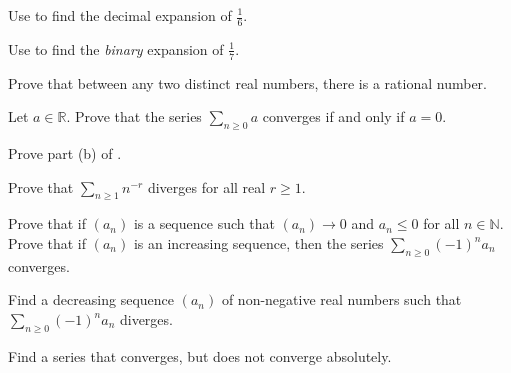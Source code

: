 \begin{exercise}
Use  to find the decimal expansion of $\frac{1}{6}$.
\end{exercise}

\begin{exercise}
Use  to find the \textit{binary} expansion of $\frac{1}{7}$.
\end{exercise}

\begin{exercise}
Prove that between any two distinct real numbers, there is a rational number.
\end{exercise}


\begin{exercise}
Let $a \in \mathbb{R}$. Prove that the series $\sum_{n \ge 0} a$ converges if and only if $a=0$.
\end{exercise}


\begin{exercise}
Prove part (b) of .
\end{exercise}


\begin{exercise}
Prove that $\displaystyle \sum_{n \ge 1} n^{-r}$ diverges for all real $r \ge 1$.
\end{exercise}



\begin{exercise}
Prove that if $(a_n)$ is a sequence such that $(a_n) \to 0$ and $a_n \le 0$ for all $n \in \mathbb{N}$. Prove that if $(a_n)$ is an increasing sequence, then the series $\displaystyle \sum_{n \ge 0} (-1)^n a_n$ converges.
\end{exercise}

\begin{exercise}
Find a decreasing sequence $(a_n)$ of non-negative real numbers such that $\displaystyle \sum_{n \ge 0} (-1)^n a_n$ diverges.
\end{exercise}



\begin{exercise}
Find a series that converges, but does not converge absolutely.
\end{exercise}

